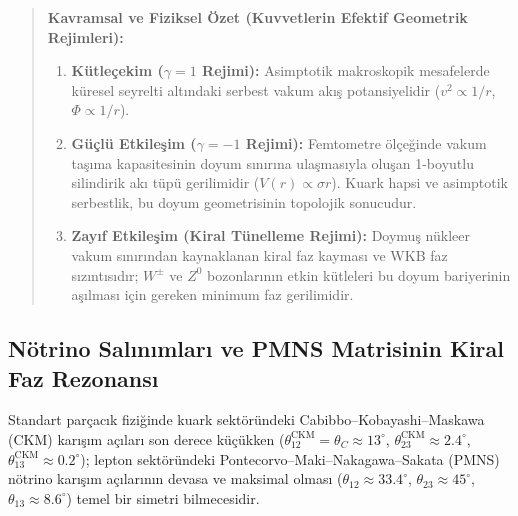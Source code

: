 \begin{quote}
    \small
    \textbf{Kavramsal ve Fiziksel Özet (Kuvvetlerin Efektif Geometrik Rejimleri):}
    \begin{enumerate}
        \item \textbf{Kütleçekim ($\gamma = 1$ Rejimi):} Asimptotik makroskopik mesafelerde küresel seyrelti altındaki serbest vakum akış potansiyelidir ($v^2 \propto 1/r$, $\Phi \propto 1/r$).
        \item \textbf{Güçlü Etkileşim ($\gamma = -1$ Rejimi):} Femtometre ölçeğinde vakum taşıma kapasitesinin doyum sınırına ulaşmasıyla oluşan 1-boyutlu silindirik akı tüpü gerilimidir ($V(r) \propto \sigma r$). Kuark hapsi ve asimptotik serbestlik, bu doyum geometrisinin topolojik sonucudur.
        \item \textbf{Zayıf Etkileşim (Kiral Tünelleme Rejimi):} Doymuş nükleer vakum sınırından kaynaklanan kiral faz kayması ve WKB faz sızıntısıdır; $W^\pm$ ve $Z^0$ bozonlarının etkin kütleleri bu doyum bariyerinin aşılması için gereken minimum faz gerilimidir.
    \end{enumerate}
\end{quote}

\subsection{Nötrino Salınımları ve PMNS Matrisinin Kiral Faz Rezonansı}
\label{sec:notrino_pmns_main}

Standart parçacık fiziğinde kuark sektöründeki Cabibbo--Kobayashi--Maskawa (CKM) karışım açıları son derece küçükken ($\theta_{12}^{\mathrm{CKM}} = \theta_C \approx 13^\circ$, $\theta_{23}^{\mathrm{CKM}} \approx 2.4^\circ$, $\theta_{13}^{\mathrm{CKM}} \approx 0.2^\circ$); lepton sektöründeki Pontecorvo--Maki--Nakagawa--Sakata (PMNS) nötrino karışım açılarının devasa ve maksimal olması ($\theta_{12} \approx 33.4^\circ$, $\theta_{23} \approx 45^\circ$, $\theta_{13} \approx 8.6^\circ$) temel bir simetri bilmecesidir.

